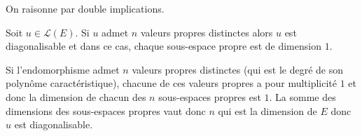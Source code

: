 \documentclass[french,11pt,twoside]{VcCours}
\begin{document}
\begin{Demonstration}{} On raisonne par double implications.

%
%

\vspace{9.cm}
\end{Demonstration}

\begin{Corollaire}{} Soit $u \in \mathcal{L}(E)$. Si $u$ admet $n$ valeurs propres distinctes alors $u$ est diagonalisable et dans ce cas, chaque sous-espace propre est de dimension $1$.
\end{Corollaire}



\begin{Demonstration}{} Si l'endomorphisme admet $n$ valeurs propres distinctes (qui est le degré de son polynôme caractéristique), chacune de ces valeurs propres a pour multiplicité $1$ et donc la dimension de chacun des $n$ sous-espaces propres est $1$. La somme des dimensions des sous-espaces propres vaut donc $n$ qui est la dimension de $E$ donc $u$ est diagonalisable.
\end{Demonstration}
\end{document}
